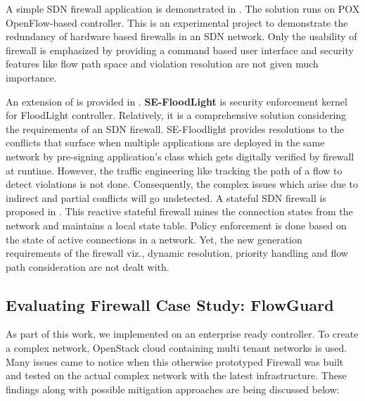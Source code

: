 A simple SDN firewall application is demonstrated in \cite{FWSDN}. The solution runs on POX OpenFlow-based controller. This is an experimental project to demonstrate the redundancy of hardware based firewalls in an SDN network. Only the usability of firewall is emphasized by providing a command based user interface and security features like flow path space and violation resolution are not given much importance. 

An extension of \cite{FORTNOX} is provided in \cite{SEFLOOD}. \textbf{SE-FloodLight} is security enforcement kernel for FloodLight controller. Relatively, it is a comprehensive solution considering the requirements of an SDN firewall. SE-Floodlight provides resolutions to the conflicts that surface when multiple applications are deployed in the same network by pre-signing application's class which gets digitally verified by firewall at runtime. However, the traffic engineering like tracking the path of a flow to detect violations is not done. Consequently, the complex issues which arise due to indirect and partial conflicts will go undetected. 
A stateful SDN firewall is proposed in \cite{REACTIVEFW}. This reactive stateful firewall mines the connection states from the network and maintains a local state table. Policy enforcement is done based on the state of active connections in a network. Yet, the new generation requirements of the firewall viz., dynamic resolution, priority handling and flow path consideration are not dealt with. 

\subsection{Evaluating Firewall Case Study: FlowGuard}
As part of this work, we implemented \cite{FLOWGUARD} on an enterprise ready controller. To create a complex network, OpenStack cloud containing multi tenant networks is used. Many issues came to notice when this otherwise prototyped Firewall was built and tested on the actual complex network with the latest infrastructure. These findings along with possible mitigation approaches are being discussed below:


